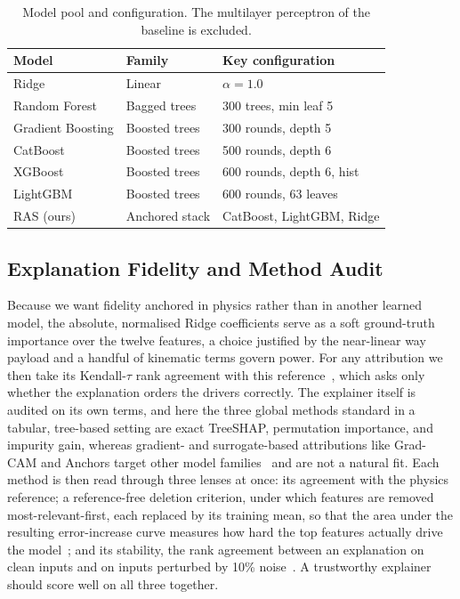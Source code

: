 \documentclass[conference]{IEEEtran}
\begin{document}
\begin{table}[t]
\centering
\caption{Model pool and configuration. The multilayer perceptron of the baseline is excluded.}
\label{tab:models}
\small
\begin{tabular}{@{}lll@{}}
\toprule
Model & Family & Key configuration \\
\midrule
Ridge & Linear & $\alpha=1.0$ \\
Random Forest & Bagged trees & 300 trees, min leaf 5 \\
Gradient Boosting & Boosted trees & 300 rounds, depth 5 \\
CatBoost & Boosted trees & 500 rounds, depth 6 \\
XGBoost & Boosted trees & 600 rounds, depth 6, hist \\
LightGBM & Boosted trees & 600 rounds, 63 leaves \\
RAS (ours) & Anchored stack & CatBoost, LightGBM, Ridge \\
\bottomrule
\end{tabular}
\end{table}

\subsection{Explanation Fidelity and Method Audit}
Because we want fidelity anchored in physics rather than in another learned model, the absolute, normalised Ridge coefficients serve as a soft ground-truth importance over the twelve features, a choice justified by the near-linear way payload and a handful of kinematic terms govern power. For any attribution we then take its Kendall-$\tau$ rank agreement with this reference~\cite{kendall1938new}, which asks only whether the explanation orders the drivers correctly. The explainer itself is audited on its own terms, and here the three global methods standard in a tabular, tree-based setting are exact TreeSHAP, permutation importance, and impurity gain, whereas gradient- and surrogate-based attributions like Grad-CAM and Anchors target other model families~\cite{selvaraju2017gradcam} and are not a natural fit. Each method is then read through three lenses at once: its agreement with the physics reference; a reference-free deletion criterion, under which features are removed most-relevant-first, each replaced by its training mean, so that the area under the resulting error-increase curve measures how hard the top features actually drive the model~\cite{hooker2019benchmark}; and its stability, the rank agreement between an explanation on clean inputs and on inputs perturbed by 10\% noise~\cite{alvarezmelis2018robustness}. A trustworthy explainer should score well on all three together.
\end{document}
